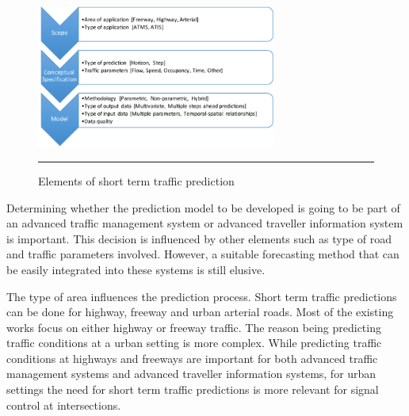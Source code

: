 \begin{figure}[htbp]
  \centering
    \includegraphics[width=0.7\textwidth,height=0.7\textheight,keepaspectratio]{Figures/sttp-process.pdf}
    \rule{35em}{0.5pt}
  \caption[Elements of short term traffic prediction]{Elements of short term traffic prediction}
  \label{fig:sttp-process}
\end{figure}

Determining whether the prediction model to be developed is going to be part of an advanced
traffic management system or advanced traveller information system is important. This decision is influenced
by other elements such as type of road and traffic parameters involved. However, a suitable
forecasting method that can be easily integrated into these systems is still elusive.

The type of area influences the prediction process. Short term traffic predictions can be done for
highway, freeway and urban arterial roads. Most of the existing works focus on either highway or
freeway traffic. The reason being predicting traffic conditions at a urban setting is more complex.
While predicting traffic conditions at highways and freeways are important for both advanced traffic
management systems and advanced traveller information systems, for urban settings the need for short
term traffic predictions is more relevant for signal control at intersections.

